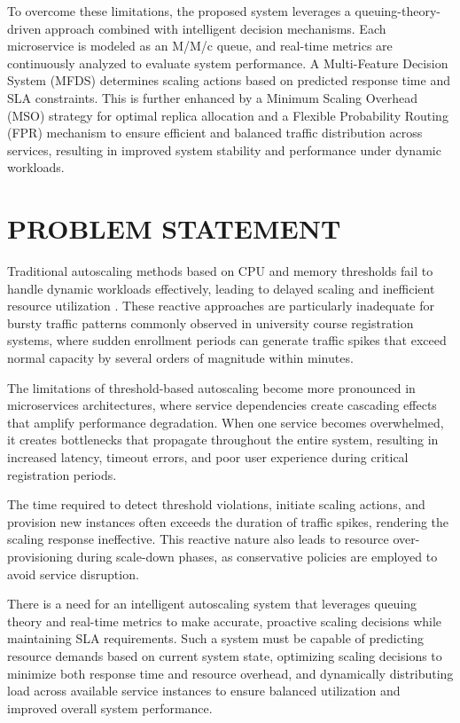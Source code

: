 To overcome these limitations, the proposed system leverages a queuing-theory-driven approach combined with intelligent decision mechanisms. Each microservice is modeled as an M/M/c queue, and real-time metrics are continuously analyzed to evaluate system performance. A Multi-Feature Decision System (MFDS) determines scaling actions based on predicted response time and SLA constraints. This is further enhanced by a Minimum Scaling Overhead (MSO) strategy for optimal replica allocation and a Flexible Probability Routing (FPR) mechanism to ensure efficient and balanced traffic distribution across services, resulting in improved system stability and performance under dynamic workloads.


\section{PROBLEM STATEMENT}

Traditional autoscaling methods based on CPU and memory thresholds fail to handle dynamic workloads effectively, leading to delayed scaling and inefficient resource utilization \cite{khaleq2021}. These reactive approaches are particularly inadequate for bursty traffic patterns commonly observed in university course registration systems, where sudden enrollment periods can generate traffic spikes that exceed normal capacity by several orders of magnitude within minutes.

The limitations of threshold-based autoscaling become more pronounced in microservices architectures, where service dependencies create cascading effects that amplify performance degradation. When one service becomes overwhelmed, it creates bottlenecks that propagate throughout the entire system, resulting in increased latency, timeout errors, and poor user experience during critical registration periods.

The time required to detect threshold violations, initiate scaling actions, and provision new instances often exceeds the duration of traffic spikes, rendering the scaling response ineffective. This reactive nature also leads to resource over-provisioning during scale-down phases, as conservative policies are employed to avoid service disruption.

There is a need for an intelligent autoscaling system that leverages queuing theory and real-time metrics to make accurate, proactive scaling decisions while maintaining SLA requirements. Such a system must be capable of predicting resource demands based on current system state, optimizing scaling decisions to minimize both response time and resource overhead, and dynamically distributing load across available service instances to ensure balanced utilization and improved overall system performance.

